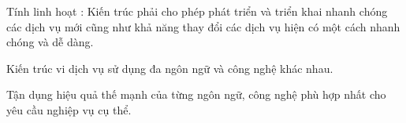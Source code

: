 Tính linh hoạt : Kiến trúc phải cho phép phát triển và triển khai nhanh chóng các dịch vụ mới cũng như khả năng thay đổi các dịch vụ hiện có một cách nhanh chóng và dễ dàng.

Kiến trúc vi dịch vụ sử dụng đa ngôn ngữ và công nghệ khác nhau.

Tận dụng hiệu quả thế mạnh của từng ngôn ngữ, công nghệ phù hợp nhất cho yêu cầu nghiệp vụ cụ thể.
















